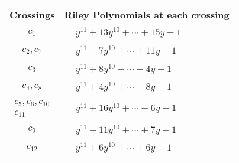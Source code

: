 \documentclass[1p]{elsarticle_modified}
\theoremstyle{definition}
\begin{document}
\begin{tabular}{m{50pt}|m{274pt}}
Crossings & \hspace{64pt}Riley Polynomials at each crossing \\
\hline $$\begin{aligned}c_{1}\end{aligned}$$&$\begin{aligned}
&y^{11}+13 y^{10}+\cdots+15 y-1
\end{aligned}$\\
\hline $$\begin{aligned}c_{2},c_{7}\end{aligned}$$&$\begin{aligned}
&y^{11}-7 y^{10}+\cdots+11 y-1
\end{aligned}$\\
\hline $$\begin{aligned}c_{3}\end{aligned}$$&$\begin{aligned}
&y^{11}+8 y^{10}+\cdots-4 y-1
\end{aligned}$\\
\hline $$\begin{aligned}c_{4},c_{8}\end{aligned}$$&$\begin{aligned}
&y^{11}+4 y^{10}+\cdots-8 y-1
\end{aligned}$\\
\hline $$\begin{aligned}c_{5},c_{6},c_{10}\\c_{11}\end{aligned}$$&$\begin{aligned}
&y^{11}+16 y^{10}+\cdots-6 y-1
\end{aligned}$\\
\hline $$\begin{aligned}c_{9}\end{aligned}$$&$\begin{aligned}
&y^{11}-11 y^{10}+\cdots+7 y-1
\end{aligned}$\\
\hline $$\begin{aligned}c_{12}\end{aligned}$$&$\begin{aligned}
&y^{11}+6 y^{10}+\cdots+6 y-1
\end{aligned}$\\
\hline
\end{tabular}\\~\\
\end{document}
